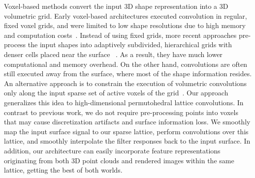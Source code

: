\documentclass[10pt,twocolumn,letterpaper]{article}
\newcommand{\camreadycomment}[1]{{\textcolor{red}{#1}}}
\begin{document}
Voxel-based methods convert the input 3D shape representation into a 3D volumetric grid. Early voxel-based architectures executed convolution in regular, fixed voxel grids, and were limited to low shape resolutions due to high memory and computation costs~\cite{wu2015shapenets,maturana2015voxnets,qi2016volmv,brock2016anothervoxnet,garciagarcia2016pointnetwhichisvoxnetactually,sedaghat2017orion}. Instead of using fixed grids, more recent approaches pre-process the input shapes into adaptively subdivided, hierarchical grids with denser cells placed near the surface ~\cite{riegler2017octnet,riegler2017OctNetFusion,klokov2017escape,wang2017ocnn,tatarchenko2017octree}. As a result, they have much lower computational and memory overhead.  On the other hand, convolutions are often still executed away from the surface, where most of the shape information resides. An alternative approach is to constrain the execution of volumetric convolutions only along the input sparse set of active voxels of the grid~\cite{graham2017ssnet}. 
Our approach generalizes this idea to high-dimensional permutohedral lattice convolutions.
In contrast to previous work, we do not require pre-processing points into voxels that may cause discretization artifacts and surface information loss. We smoothly map the input surface signal to our sparse lattice, perform convolutions over this lattice, and smoothly interpolate the filter responses back to the input surface. In addition, our architecture can easily incorporate feature representations originating from both 3D point clouds and rendered images within the same lattice, getting the best of both worlds. 
\end{document}
